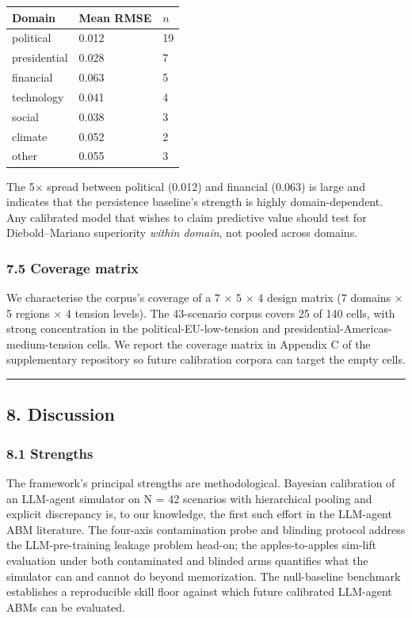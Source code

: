 \documentclass[
]{article}
\begin{document}
\begin{longtable}[]{@{}lll@{}}
\toprule\noalign{}
Domain & Mean RMSE & \(n\) \\
\midrule\noalign{}
\endhead
\bottomrule\noalign{}
\endlastfoot
political & 0.012 & 19 \\
presidential & 0.028 & 7 \\
financial & 0.063 & 5 \\
technology & 0.041 & 4 \\
social & 0.038 & 3 \\
climate & 0.052 & 2 \\
other & 0.055 & 3 \\
\end{longtable}

The 5× spread between political (0.012) and financial (0.063) is large
and indicates that the persistence baseline's strength is highly
domain-dependent. Any calibrated model that wishes to claim predictive
value should test for Diebold--Mariano superiority \emph{within domain},
not pooled across domains.

\subsubsection{7.5 Coverage matrix}\label{coverage-matrix}

We characterise the corpus's coverage of a 7 × 5 × 4 design matrix (7
domains × 5 regions × 4 tension levels). The 43-scenario corpus covers
25 of 140 cells, with strong concentration in the
political-EU-low-tension and presidential-Americas-medium-tension cells.
We report the coverage matrix in Appendix C of the supplementary
repository so future calibration corpora can target the empty cells.

\begin{center}\rule{0.5\linewidth}{0.5pt}\end{center}

\subsection{8. Discussion}\label{discussion}

\subsubsection{8.1 Strengths}\label{strengths}

The framework's principal strengths are methodological. Bayesian
calibration of an LLM-agent simulator on N = 42 scenarios with
hierarchical pooling and explicit discrepancy is, to our knowledge, the
first such effort in the LLM-agent ABM literature. The four-axis
contamination probe and blinding protocol address the LLM-pre-training
leakage problem head-on; the apples-to-apples sim-lift evaluation under
both contaminated and blinded arms quantifies what the simulator can and
cannot do beyond memorization. The null-baseline benchmark establishes a
reproducible skill floor against which future calibrated LLM-agent ABMs
can be evaluated.
\end{document}

